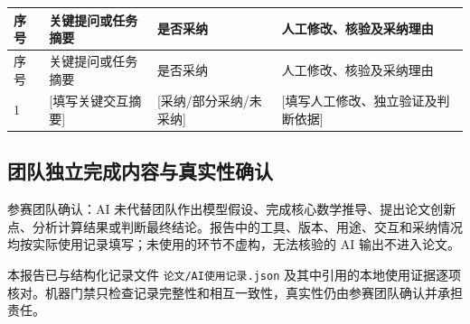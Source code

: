 \begin{longtable}{p{}p{}p{}p{}}
\toprule
序号 & 关键提问或任务摘要 & 是否采纳 & 人工修改、核验及采纳理由 \\
\midrule
\endfirsthead
\toprule
序号 & 关键提问或任务摘要 & 是否采纳 & 人工修改、核验及采纳理由 \\
\midrule
\endhead
1 & [填写关键交互摘要] & [采纳/部分采纳/未采纳] & [填写人工修改、独立验证及判断依据] \\
\bottomrule
\end{longtable}

\subsection{团队独立完成内容与真实性确认}

参赛团队确认：AI 未代替团队作出模型假设、完成核心数学推导、提出论文创新点、分析计算结果或判断最终结论。报告中的工具、版本、用途、交互和采纳情况均按实际使用记录填写；未使用的环节不虚构，无法核验的 AI 输出不进入论文。

本报告已与结构化记录文件 \texttt{论文/AI使用记录.json} 及其中引用的本地使用证据逐项核对。机器门禁只检查记录完整性和相互一致性，真实性仍由参赛团队确认并承担责任。
